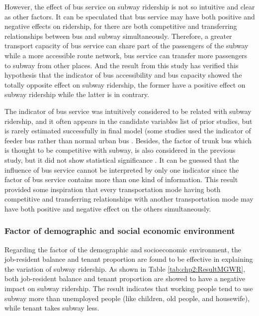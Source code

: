 %
However, the effect of bus service on subway ridership is not so intuitive and clear as other factors. It can be speculated that bus service may have both positive and negative effects on ridership, for there are both competitive and transferring relationships between bus and subway simultaneously. Therefore, a greater transport capacity of bus service can share part of the passengers of the subway while a more accessible route network, bus service can transfer more passengers to subway from other places. And the result from this study has verified this hypothesis that the indicator of bus accessibility and bus capacity showed the totally opposite effect on subway ridership, the former have a positive effect on subway ridership while the latter is in contrary. 

%
The indicator of bus service was intuitively considered to be related with subway ridership, and it often appears in the candidate variables list of prior studies, but is rarely estimated successfully in final model (some studies used the indicator of feeder bus rather than normal urban bus \cite{sohn2010factors,cardozo2012application,zhao2013influences}. Besides, the factor of trunk bus which is thought to be competitive with subway, is also considered in the previous study, but it did not show statistical significance \cite{sohn2010factors}. It can be guessed that the influence of bus service cannot be interpreted by only one indicator since the factor of bus service contains more than one kind of information. This result provided some inspiration that every transportation mode having both competitive and transferring relationships with another transportation mode may have both positive and negative effect on the others simultaneously.

%
\subsubsection{Factor of demographic and social economic environment}
%
Regarding the factor of the demographic and socioeconomic environment, the job-resident balance and tenant proportion are found to be effective in explaining the variation of subway ridership. As shown in Table \ref{tab:chp2:ResultMGWR}, both job-resident balance and tenant proportion are showed to have a negative impact on subway ridership. The result indicates that working people tend to use subway more than unemployed people (like children, old people, and housewife), while tenant takes subway less.

